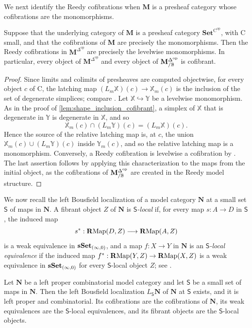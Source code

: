 \documentclass[10pt,reqno]{amsart}
\begin{document}
We next identify the Reedy cofibrations when $\mathbf M$ is a
presheaf category whose cofibrations are the monomorphisms.
\begin{lemma}
\label{lem:presheaf_reedy_cofibrancy}
Suppose that the underlying category of $\mathbf M$ is a presheaf
category $\mathbf{Set}^{\mathrm C^{\mathrm{op}}}$, with
$\mathrm C$ small, and that the cofibrations of $\mathbf M$ are
precisely the monomorphisms. Then the Reedy cofibrations in
$\mathbf M^{\Delta^{\mathrm{op}}}$ are precisely the levelwise
monomorphisms. In particular, every object of
$\mathbf M^{\Delta^{\mathrm{op}}}$ and every object of
$\mathbf M^{\Delta^{\mathrm{op}}}_{/\mathbb B}$ is cofibrant.
\end{lemma}
\begin{proof}
Since limits and colimits of presheaves are computed objectwise, for
every object $c$ of $\mathrm C$, the latching map
$(L_m\mathbb X)(c)\to\mathbb X_m(c)$ is the inclusion of the set of
degenerate simplices; compare
\cite[Lemma~15.8.4 and Proposition~15.8.6]{hirschhorn2003model}.
Let $\mathbb X\hookrightarrow\mathbb Y$ be a levelwise
monomorphism. As in the proof of \cref{lem:shape_inclusion_cofibrant},
a simplex of $\mathbb X$ that is degenerate in $\mathbb Y$ is
degenerate in $\mathbb X$, and so
\[
\mathbb X_m(c)\cap(L_m\mathbb Y)(c)=(L_m\mathbb X)(c).
\]
Hence the source of the relative latching map is, at $c$, the union
$\mathbb X_m(c)\cup(L_m\mathbb Y)(c)$ inside $\mathbb Y_m(c)$, and
so the relative latching map is a monomorphism. Conversely, a Reedy
cofibration is levelwise a cofibration by
\cite[Proposition~15.3.11\textup{(1)}]{hirschhorn2003model}. The last
assertion follows by applying this characterization to the maps from
the initial object, as the cofibrations of $\mathbf M^{\Delta^{\mathrm{op}}}_{/\mathbb B}$ are
created in the Reedy model structure.
\end{proof}

We now recall the left Bousfield localization of a model category
$\mathbf N$ at a small set $\mathsf S$ of maps in $\mathbf N$.
A fibrant object $Z$ of $\mathbf N$ is \emph{$\mathsf S$-local}
if, for every map $s:A\to D$ in $\mathsf S$, the induced map
\[
s^*:\mathbf{R}\mathrm{Map}(D,Z)
\longrightarrow\mathbf{R}\mathrm{Map}(A,Z)
\]
is a weak equivalence in $\mathbf{sSet}_{(\infty,0)}$, and a map
$f:X\to Y$ in $\mathbf N$ is an
\emph{$\mathsf S$-local equivalence} if the induced map
$f^*:\mathbf{R}\mathrm{Map}(Y,Z)\to\mathbf{R}\mathrm{Map}(X,Z)$ is a weak equivalence in
$\mathbf{sSet}_{(\infty,0)}$ for every $\mathsf S$-local object $Z$; see
\cite[Definition~3.1.4\textup{(1)}]{hirschhorn2003model}.
\begin{theorem}
\label{thm:left_bousfield_localization}
Let $\mathbf N$ be a left proper combinatorial model category and
let $\mathsf S$ be a small set of maps in $\mathbf N$. Then the
left Bousfield localization $L_{\mathsf S}\mathbf N$ of $\mathbf N$
at $\mathsf S$ exists, and it is left proper and combinatorial. Its
cofibrations are the cofibrations of $\mathbf N$, its weak
equivalences are the $\mathsf S$-local equivalences, and its fibrant
objects are the $\mathsf S$-local objects.
\end{theorem}
\end{document}
